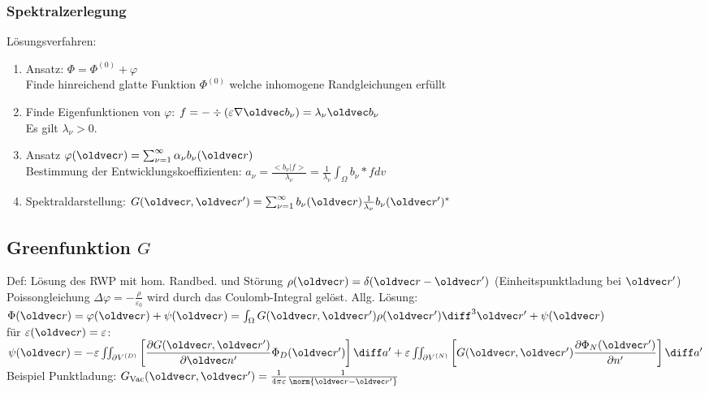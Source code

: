 \documentclass[6pt,a4paper]{scrartcl}
\let\vec\oldvec
\begin{document}
\begin{multicols}{4}
	\subsubsection{Spektralzerlegung}
	Lösungsverfahren:\\
	\begin{enumerate}
		\item Ansatz: $\Phi = \Phi^{(0)} + \varphi$\\
		Finde hinreichend glatte Funktion $\Phi^{(0)}$ welche inhomogene Randgleichungen erfüllt
		\item Finde Eigenfunktionen von $\varphi$: $f=-\div(\varepsilon \nabla \vec b_\nu) = \lambda_\nu \vec b_\nu$\\
			Es gilt $\lambda_\nu > 0$.
		\item Ansatz $\varphi(\vec r) = \sum_{\nu = 1}^\infty \alpha_\nu b_\nu(\vec r)$\\
		Bestimmung der Entwicklungskoeffizienten: $a_\nu = \frac{<b_\nu|f>}{\lambda_\nu} = \frac{1}{\lambda_\nu}\int_\Omega b_\nu * f dv$\\
		\item Spektraldarstellung: $G(\vec r, \vec r') = \sum_{\nu = 1}^\infty b_\nu (\vec r) \frac{1}{\lambda_\nu} b_\nu (\vec r')^*$\\
	\end{enumerate}
	
	
	
	\subsection{Greenfunktion $G$}
	Def: Lösung des RWP mit hom. Randbed. und Störung $\rho(\vec r) = \delta(\vec r - \vec r')$ (Einheitspunktladung bei $\vec r'$)\\
	Poissongleichung $\Delta\varphi = -\frac{\rho}{\varepsilon_0}$ wird durch das Coulomb-Integral gelöst.
	Allg. Lösung: $\Phi(\vec r) = \varphi(\vec r)+\psi(\vec r) = \int_\Omega G(\vec r, \vec r')\rho(\vec r') \diff^3 \vec r' + \psi(\vec r)$\\
	für $\varepsilon(\vec r) = \varepsilon$: $\psi(\vec r) = -\varepsilon\iint_{\partial V^{(D)}}\left[\dfrac{\partial G(\vec r, \vec r')}{\partial\vec n'}\Phi_D(\vec r')\right]\diff a'+\varepsilon\iint_{\partial V^{(N)}}\left[G(\vec r, \vec r')\dfrac{\partial\Phi_N(\vec r')}{\partial n'}\right]\diff a'$
	\\
	Beispiel Punktladung: $G_{\text{Vac}}(\vec r, \vec r') = \frac{1}{4 \pi \varepsilon} \frac{1}{\norm{\vec r - \vec r'}}$
	

\end{multicols}
\end{document}
